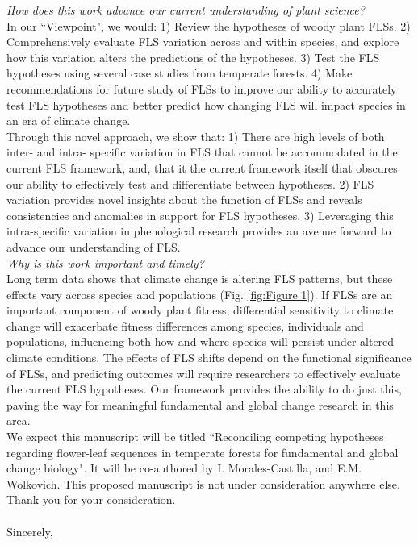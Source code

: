 \documentclass[10.5pt,a4paper]{article}
\begin{document}
\noindent \emph{How does this work advance our current understanding of plant science?}\\ %

\noindent In our ``Viewpoint", we would: 1) Review the hypotheses of woody plant FLSs. 2) Comprehensively evaluate FLS variation across and within species, and explore how this variation alters the predictions of the hypotheses. 3) Test the FLS hypotheses using several case studies from temperate forests. 4)
Make recommendations for future study of FLSs to improve our ability to accurately test FLS hypotheses and better predict how changing FLS will impact species in an era of climate change. \\

\noindent Through this novel approach, we show that: 1) There are high levels of both inter- and intra- specific variation in FLS that cannot be accommodated in the current FLS framework, and, that it the current framework itself that obscures our ability to effectively test and differentiate between hypotheses. 2) FLS variation provides novel insights about the function of FLSs and reveals consistencies and anomalies in support for FLS hypotheses. 3) Leveraging this intra-specific variation in phenological research provides an avenue forward to advance our understanding of FLS.\\

\noindent \emph{Why is this work important and timely?}\\

\noindent Long term data shows that climate change is altering FLS patterns, but these effects vary across species and populations (Fig. \ref{fig:Figure 1}). If FLSs are an important component of woody plant fitness, differential sensitivity to climate change will exacerbate fitness differences among species, individuals and populations, influencing both how and where species will persist under altered climate conditions. The effects of FLS shifts depend on the functional significance of FLSs, and predicting outcomes will require researchers to effectively evaluate the current FLS hypotheses. Our framework provides the ability to do just this, paving the way for meaningful fundamental and global change research in this area.\\

 \noindent We expect this manuscript will be titled ``Reconciling competing hypotheses regarding flower-leaf sequences in temperate forests for fundamental and global change biology". It will be co-authored by I. Morales-Castilla, and E.M. Wolkovich. This proposed manuscript is not under consideration anywhere else. Thank you for your consideration.\\
\\Sincerely,\\
\end{document}
